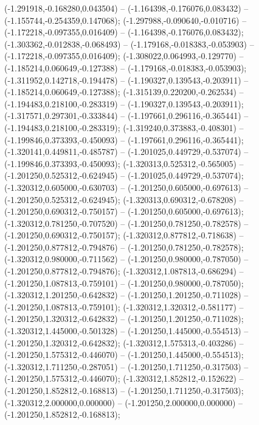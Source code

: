  (-1.291918,-0.168280,0.043504) -- (-1.164398,-0.176076,0.083432) -- (-1.155744,-0.254359,0.147068);
 (-1.297988,-0.090640,-0.010716) -- (-1.172218,-0.097355,0.016409) -- (-1.164398,-0.176076,0.083432);
 (-1.303362,-0.012838,-0.068493) -- (-1.179168,-0.018383,-0.053903) -- (-1.172218,-0.097355,0.016409);
 (-1.308022,0.064993,-0.129770) -- (-1.185214,0.060649,-0.127388) -- (-1.179168,-0.018383,-0.053903);
 (-1.311952,0.142718,-0.194478) -- (-1.190327,0.139543,-0.203911) -- (-1.185214,0.060649,-0.127388);
 (-1.315139,0.220200,-0.262534) -- (-1.194483,0.218100,-0.283319) -- (-1.190327,0.139543,-0.203911);
 (-1.317571,0.297301,-0.333844) -- (-1.197661,0.296116,-0.365441) -- (-1.194483,0.218100,-0.283319);
 (-1.319240,0.373883,-0.408301) -- (-1.199846,0.373393,-0.450093) -- (-1.197661,0.296116,-0.365441);
 (-1.320141,0.449811,-0.485787) -- (-1.201025,0.449729,-0.537074) -- (-1.199846,0.373393,-0.450093);
 (-1.320313,0.525312,-0.565005) -- (-1.201250,0.525312,-0.624945) -- (-1.201025,0.449729,-0.537074);
 (-1.320312,0.605000,-0.630703) -- (-1.201250,0.605000,-0.697613) -- (-1.201250,0.525312,-0.624945);
 (-1.320313,0.690312,-0.678208) -- (-1.201250,0.690312,-0.750157) -- (-1.201250,0.605000,-0.697613);
 (-1.320312,0.781250,-0.707520) -- (-1.201250,0.781250,-0.782578) -- (-1.201250,0.690312,-0.750157);
 (-1.320312,0.877812,-0.718638) -- (-1.201250,0.877812,-0.794876) -- (-1.201250,0.781250,-0.782578);
 (-1.320312,0.980000,-0.711562) -- (-1.201250,0.980000,-0.787050) -- (-1.201250,0.877812,-0.794876);
 (-1.320312,1.087813,-0.686294) -- (-1.201250,1.087813,-0.759101) -- (-1.201250,0.980000,-0.787050);
 (-1.320312,1.201250,-0.642832) -- (-1.201250,1.201250,-0.711028) -- (-1.201250,1.087813,-0.759101);
 (-1.320312,1.320312,-0.581177) -- (-1.201250,1.320312,-0.642832) -- (-1.201250,1.201250,-0.711028);
 (-1.320312,1.445000,-0.501328) -- (-1.201250,1.445000,-0.554513) -- (-1.201250,1.320312,-0.642832);
 (-1.320312,1.575313,-0.403286) -- (-1.201250,1.575312,-0.446070) -- (-1.201250,1.445000,-0.554513);
 (-1.320312,1.711250,-0.287051) -- (-1.201250,1.711250,-0.317503) -- (-1.201250,1.575312,-0.446070);
 (-1.320312,1.852812,-0.152622) -- (-1.201250,1.852812,-0.168813) -- (-1.201250,1.711250,-0.317503);
 (-1.320312,2.000000,0.000000) -- (-1.201250,2.000000,0.000000) -- (-1.201250,1.852812,-0.168813);
